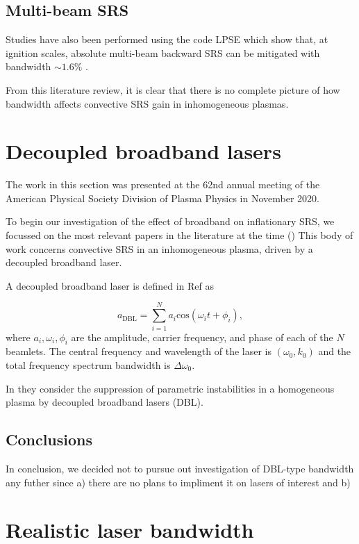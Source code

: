 \subsection{Multi-beam SRS}
Studies have also been performed using the code LPSE which show that, at ignition scales, absolute multi-beam backward SRS can be mitigated with bandwidth $\sim 1.6\%$ \citep{Follett2021}.

From this literature review, it is clear that there is no complete picture of how bandwidth affects convective SRS gain in inhomogeneous plasmas.

\section{Decoupled broadband lasers}

The work in this section was presented at the 62nd annual meeting of the American Physical Society Division of Plasma Physics in November 2020.
 
To begin our investigation of the effect of broadband on inflationary SRS, we focussed on the most relevant papers in the literature at the time (\citep{Zhao2019}) This body of work concerns convective SRS in an inhomogeneous plasma, driven by a decoupled broadband laser.


A decoupled broadband laser is defined in Ref \cite{Zhao2017July} as

\begin{equation}\label{eqn:DBL}
  a_{\mathrm{DBL}} = \sum_{i=1}^{N} a_i \mathrm{cos}(\omega_it + \phi_i),
\end{equation}
where $a_i,\omega_i,\phi_i$ are the amplitude, carrier frequency, and phase of
each of the $N$ beamlets. The central frequency and wavelength of the laser is
$(\omega_0,k_0)$ and the total frequency spectrum bandwidth is
$\Delta\omega_0$.

In \cite{Zhao2019} they consider the suppression of parametric
instabilities in a homogeneous plasma by decoupled broadband lasers
(\acrshort{DBL}). 

\subsection{Conclusions}
In conclusion, we decided not to pursue out investigation of DBL-type bandwidth any futher since a) there are no plans to impliment it on lasers of interest and b) 


\section{Realistic laser bandwidth}\label{sec:params}

